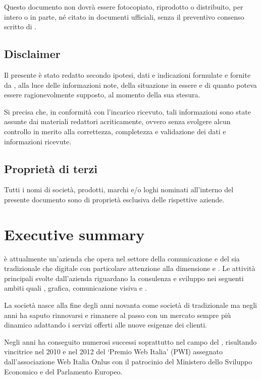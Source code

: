 Questo documento non dovrà essere fotocopiato, riprodotto o distribuito, per intero o in parte, né citato in documenti ufficiali, senza il preventivo consenso scritto di \customer.

\section{Disclaimer}
Il presente  è stato redatto secondo ipotesi, dati e indicazioni formulate e fornite da \customer, alla luce delle informazioni note, della situazione in essere e di quanto poteva essere ragionevolmente supposto, al momento della sua stesura.

Si precisa che, in conformità con l'incarico ricevuto, tali informazioni sono state assunte dai materiali redattori acriticamente, ovvero senza svolgere alcun controllo in merito alla correttezza, completezza e validazione dei dati e informazioni ricevute.

\section{Proprietà di terzi}\markboth{}{}
Tutti i nomi di società, prodotti, marchi e/o loghi nominati all'interno del presente documento sono di proprietà esclusiva delle rispettive aziende.

\chapter{Executive summary}\label{sec:summary}

\customer è attualmente un'azienda che opera nel settore della comunicazione e del \mktg sia tradizionale che digitale con particolare attenzione alla dimensione  e . Le attività principali svolte dall'azienda riguardano la consulenza e sviluppo nei seguenti ambiti quali , grafica, comunicazione visiva e \mktg {}.

La società nasce alla fine degli anni novanta come società di  tradizionale ma negli anni ha saputo rinnovarsi e rimanere al passo con un mercato sempre più dinamico adattando i servizi offerti alle nuove esigenze dei clienti.

Negli anni \customer ha conseguito numerosi successi soprattutto nel campo del , risultando vincitrice nel 2010 e nel 2012 del `Premio Web Italia' (PWI) assegnato dall'associazione \textsf{Web Italia Onlus} con il patrocinio del Ministero dello Sviluppo Economico e del Parlamento Europeo.

